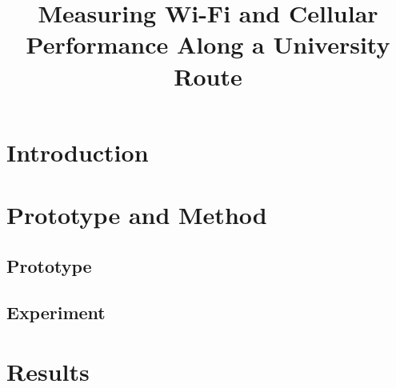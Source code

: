 \documentclass[conference]{IEEEtran}
\begin{document}
\title{Measuring Wi-Fi and Cellular Performance Along a University Route}
\author{
}
\maketitle

\begin{abstract}
\end{abstract}

\section{Introduction}

\section{Prototype and Method}
\subsection{Prototype}
\subsection{Experiment}

\section{Results}
\end{document}
